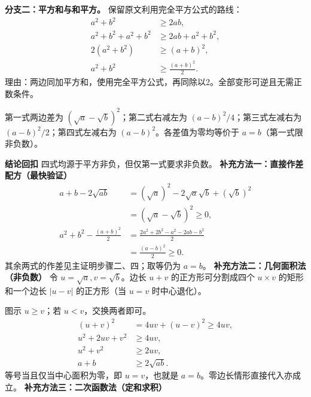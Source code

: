 \begin{proofbox}
\begin{description}[style=nextline,leftmargin=2.8em,labelsep=.5em,itemsep=.55em]
\textbf{分支二：平方和与和平方。} 保留原文利用完全平方公式的路线：
\begin{align*}a^2+b^2&\ge2ab,\\
a^2+b^2+a^2+b^2&\ge2ab+a^2+b^2,\\
2(a^2+b^2)&\ge(a+b)^2,\\
a^2+b^2&\ge\frac{(a+b)^2}{2}.\end{align*}
理由：两边同加平方和，使用完全平方公式，再同除以2。全部变形可逆且无需正数条件。
\item[\textbf{步骤五（统一取等验证）：}]
第一式两边差为 $(\sqrt a-\sqrt b)^2$；第二式右减左为 $(a-b)^2/4$；第三式左减右为 $(a-b)^2/2$；第四式左减右为 $(a-b)^2$。各差值为零均等价于 $a=b$（第一式限非负数）。
\end{description}
\textbf{\textcolor{CProof}{结论回扣}} 四式均源于平方非负，但仅第一式要求非负数。
\medskip
\textbf{补充方法一：直接作差配方（最快验证）}
\begin{align*}a+b-2\sqrt{ab}&=(\sqrt a)^2-2\sqrt a\sqrt b+(\sqrt b)^2\\&=(\sqrt a-\sqrt b)^2\ge0,\\
a^2+b^2-\frac{(a+b)^2}{2}&=\frac{2a^2+2b^2-a^2-2ab-b^2}{2}\\&=\frac{(a-b)^2}{2}\ge0.\end{align*}
其余两式的作差见主证明步骤二、四；取等仍为 $a=b$。
\medskip\textbf{补充方法二：几何面积法（非负数）}
令 $u=\sqrt a,v=\sqrt b$。边长 $u+v$ 的正方形可分割成四个 $u\times v$ 的矩形和一个边长 $|u-v|$ 的正方形（当 $u=v$ 时中心退化）。
\begin{center}
\end{center}
图示 $u\ge v$；若 $u<v$，交换两者即可。
\begin{align*}(u+v)^2&=4uv+(u-v)^2\ge4uv,\\
u^2+2uv+v^2&\ge4uv,\\u^2+v^2&\ge2uv,\\a+b&\ge2\sqrt{ab}.\end{align*}
等号当且仅当中心面积为零，即 $u=v$，也就是 $a=b$。零边长情形直接代入亦成立。
\medskip\textbf{补充方法三：二次函数法（定和求积）}

\end{proofbox}
